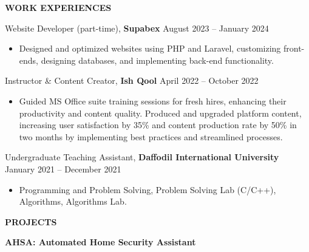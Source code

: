 \documentclass[a4paper, 12pt]{article}
\begin{document}


\begin{flushleft}
	\noindent
	\textbf{WORK EXPERIENCES}\hrulefill
\end{flushleft}
\vspace{-12pt}

Website Developer (part-time), \textbf{Supabex} \hfill August 2023 -- January 2024 
\begin{itemize}[noitemsep, topsep=0pt, partopsep=0pt, parsep=0pt]
	\item Designed and optimized websites using PHP and Laravel, customizing front-ends, designing databases, and implementing back-end functionality.
\end{itemize}
\vspace{12pt}

Instructor \& Content Creator, \textbf{Ish Qool} \hfill April 2022 -- October 2022
\begin{itemize}[noitemsep, topsep=0pt, partopsep=0pt, parsep=0pt]
	\item Guided MS Office suite training sessions for fresh hires, enhancing their productivity and content quality. Produced and upgraded platform content, increasing user satisfaction by 35\% and content production rate by 50\% in two months by implementing best practices and streamlined processes.
\end{itemize}
\vspace{12pt}

Undergraduate Teaching Assistant, \textbf{Daffodil International University} \hfill January 2021 -- December 2021
\begin{itemize}[noitemsep, topsep=0pt, partopsep=0pt, parsep=0pt]
	\item Programming and Problem Solving, Problem Solving Lab (C/C++), Algorithms, Algorithms Lab.
\end{itemize}



\newpage
\begin{flushleft}
	\noindent
	\textbf{PROJECTS}\hrulefill
\end{flushleft}
\vspace{-12pt}

\textbf{AHSA: Automated Home Security Assistant}
\end{document}
